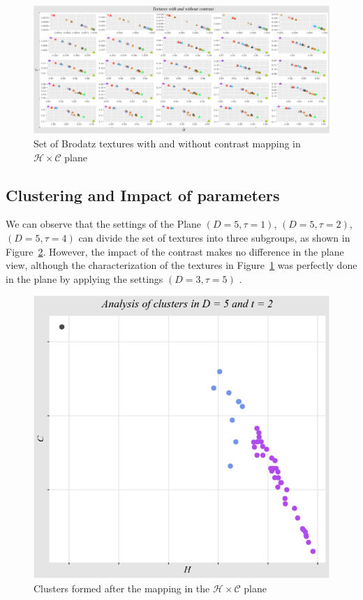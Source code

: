 \documentclass[12pt]{article}
\begin{document}
\begin{figure}[!h]
	\centering
	\includegraphics[scale = 0.42]{../../Images/Textures/Textures_Contrast.png}        
	\caption{Set of Brodatz textures with and without contrast mapping in $\mathcal H\times \mathcal C$ plane}
	\label{fig:texturescontrastHC}
\end{figure}

\subsection{Clustering and Impact of parameters}

We can observe that the settings of the Plane $ (D = 5, \tau = 1) $, $ (D = 5, \tau = 2) $, $ (D = 5, \tau = 4) $ can divide the set of textures into three subgroups, as shown in Figure~\ref{fig:clusters}. However, the impact of the contrast makes no difference in the plane view, although the characterization of the textures in Figure~\ref{fig:texturescontrastHC} was perfectly done in the plane by applying the settings $ (D = 3, \tau = 5) $ .

\begin{figure}[!h]
	\centering
	\includegraphics[scale = 0.6]{../../Images/Textures/cluters_textures.png}        
	\caption{Clusters formed after the mapping in the $\mathcal H\times \mathcal C$ plane}
	\label{fig:clusters}
\end{figure}



\end{document}
